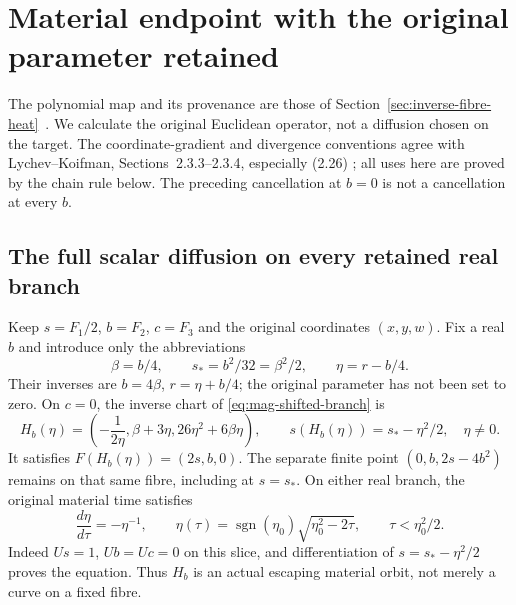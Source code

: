 \section[Material endpoint: retained parameter and arithmetic jets]{Material endpoint with the original parameter retained}
\label{sec:endpoint-jets}

The polynomial map and its provenance are those of
Section~\ref{sec:inverse-fibre-heat}~\cite{tao2026jacobian,speyer2026jacobian,poplett2026alias}.
We calculate the original Euclidean operator, not a diffusion chosen on
the target. The coordinate-gradient and divergence conventions agree
with Lychev--Koifman, Sections~2.3.3--2.3.4, especially (2.26)
\cite{lychevKoifman2019}; all uses here are proved by the chain rule below.
The preceding cancellation at $b=0$ is not a cancellation at every $b$.

\subsection{The full scalar diffusion on every retained real branch}

Keep $s=F_1/2$, $b=F_2$, $c=F_3$ and the original coordinates $(x,y,w)$.
Fix a real $b$ and introduce only the abbreviations
\[
 \beta=b/4,\qquad s_*=b^2/32=\beta^2/2,
 \qquad \eta=r-b/4.
\]
Their inverses are $b=4\beta$, $r=\eta+b/4$; the original parameter
has not been set to zero. On $c=0$, the inverse chart of
\eqref{eq:mag-shifted-branch} is
\begin{equation}
 H_b(\eta)=\left(-\frac1{2\eta},\beta+3\eta,
                          26\eta^2+6\beta\eta\right),\qquad
 s(H_b(\eta))=s_*-\eta^2/2,\quad \eta\ne0.
 \label{eq:ej-chart}
\end{equation}
It satisfies $F(H_b(\eta))=(2s,b,0)$. The separate finite point
$(0,b,2s-4b^2)$ remains on that same fibre, including at $s=s_*$.
On either real branch, the original material time satisfies
\[
 \frac{d\eta}{d\tau}=-\eta^{-1},\qquad
 \eta(\tau)=\operatorname{sgn}(\eta_0)
                  \sqrt{\eta_0^2-2\tau},\qquad \tau<\eta_0^2/2.
\]
Indeed $Us=1$, $Ub=Uc=0$ on this slice, and differentiation of
$s=s_*-\eta^2/2$ proves the equation. Thus $H_b$ is an actual
escaping material orbit, not merely a curve on a fixed fibre.

